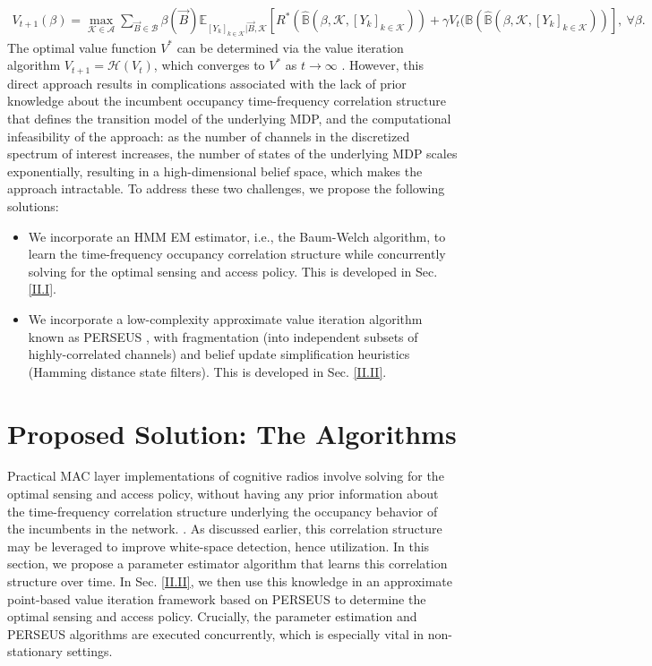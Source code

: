\documentclass[12pt, draftcls, onecolumn]{IEEEtran}
\begin{document}
\begin{equation}\label{18}
    \begin{aligned}
        V_{t+1}(\beta)
        =\max_{\mathcal{K} \in \mathcal{A}}\sum_{\vec{B} \in \mathcal{B}}\beta(\vec{B})\mathbb{E}_{[Y_{k}]_{k \in \mathcal{K}}|\vec{B},\mathcal{K}}\left[R^*(\hat{\mathbb{B}}(\beta,\mathcal{K},[Y_{k}]_{k \in \mathcal{K}}))+\gamma V_{t}(\mathbb{B}(\hat{\mathbb{B}}(\beta,\mathcal{K},[Y_{k}]_{k \in \mathcal{K}}))\right],\ \forall \beta.
    \end{aligned}
\end{equation}
The optimal value function $V^*$ can be determined via the value iteration algorithm
$V_{t+1}=\mathcal H(V_t)$, which converges to  $V^*$ as $t\to\infty$ \cite{PUOccupancy:18}. However, this direct approach results in complications associated with the lack of prior knowledge about the incumbent occupancy time-frequency correlation structure that defines the transition model of the underlying MDP, and the computational infeasibility of the approach: as the number of channels in the discretized spectrum of interest increases, the number of states of the underlying MDP scales exponentially, resulting in a high-dimensional belief space, which makes the approach intractable. To address these two challenges, we propose the following solutions:
\begin{itemize}
    \item We incorporate an HMM EM estimator, i.e., the Baum-Welch algorithm, to learn the time-frequency occupancy correlation structure while concurrently solving for the optimal sensing and access policy. This is developed in Sec. \ref{II.I}.
    \item We incorporate a low-complexity approximate value iteration algorithm known as PERSEUS \cite{WCL:13}, with fragmentation (into independent subsets of highly-correlated channels) and belief update simplification heuristics (Hamming distance state filters). This is developed in Sec. \ref{II.II}.
\end{itemize}

\section{Proposed Solution: The Algorithms}\label{II}
Practical MAC layer implementations of cognitive radios involve solving for the optimal sensing and access policy, without having any prior information about the time-frequency correlation structure underlying the occupancy behavior of the incumbents in the network. \cite{8935729, 8935774}. As discussed earlier, this correlation structure may be leveraged to improve  white-space detection, hence utilization. In this section, we propose a parameter estimator algorithm that learns this correlation structure over time. In Sec. \ref{II.II}, we then use this knowledge in an approximate
point-based value iteration framework based on PERSEUS \cite{WCL:13} to determine the optimal sensing and access policy. Crucially, the parameter estimation and PERSEUS algorithms are executed concurrently, which is especially vital in non-stationary settings.
\end{document}
